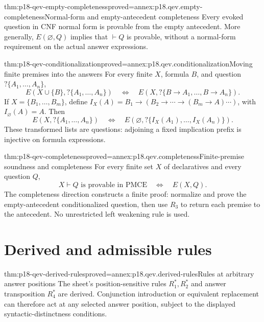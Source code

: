 \begin{hbcorollary}{thm:p18-qev-empty-completeness}{proved=annex:p18.qev.empty-completeness}{Normal-form and empty-antecedent completeness}
Every evoked question in CNF normal form is provable from the empty
antecedent. More generally, \(E(\varnothing,Q)\) implies that
\(\vdash Q\) is provable, without a normal-form requirement on
the actual answer expressions.
\end{hbcorollary}

\begin{hblemma}{thm:p18-qev-conditionalization}{proved=annex:p18.qev.conditionalization}{Moving finite premises into the answers}
For every finite \(X\), formula \(B\), and question
\(?\{A_1,\ldots,A_n\}\),
\[
 E(X\cup\{B\},?\{A_1,\ldots,A_n\})
 \quad\Longleftrightarrow\quad
 E(X,?\{B\to A_1,\ldots,B\to A_n\}).
\]
If \(X=\{B_1,\ldots,B_m\}\), define
\(I_X(A)=B_1\to(B_2\to\cdots\to(B_m\to A)\cdots)\),
with \(I_{\varnothing}(A)=A\). Then
\[
 E(X,?\{A_1,\ldots,A_n\})
 \quad\Longleftrightarrow\quad
 E(\varnothing,?\{I_X(A_1),\ldots,I_X(A_n)\}).
\]
These transformed lists are questions: adjoining a fixed implication
prefix is injective on formula expressions.
\end{hblemma}

\begin{hbtheorem}{thm:p18-qev-completeness}{proved=annex:p18.qev.completeness}{Finite-premise soundness and completeness}
For every finite set \(X\) of declaratives and every question \(Q\),
\[
 X\vdash Q\text{ is provable in PMCE}
 \quad\Longleftrightarrow\quad E(X,Q).
\]
The completeness direction constructs a finite proof: normalize and
prove the empty-antecedent conditionalized question, then use \(R_3\)
to return each premise to the antecedent. No unrestricted left
weakening rule is used.
\end{hbtheorem}

\section{Derived and admissible rules}

\begin{hblemma}{thm:p18-qev-derived-rules}{proved=annex:p18.qev.derived-rules}{Rules at arbitrary answer positions}
The sheet's position-sensitive rules \(R_1^*,R_2^*\) and answer
transposition \(R_4^*\) are derived. Conjunction introduction or
equivalent replacement can therefore act at any selected answer position,
subject to the displayed syntactic-distinctness conditions.
\end{hblemma}

